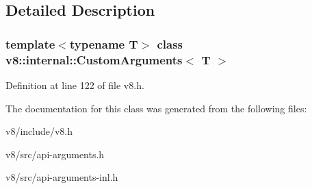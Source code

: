 \subsection{Detailed Description}
\subsubsection*{template$<$typename T$>$\newline
class v8\+::internal\+::\+Custom\+Arguments$<$ T $>$}



Definition at line 122 of file v8.\+h.



The documentation for this class was generated from the following files\+:\begin{DoxyCompactItemize}
\item 
v8/include/v8.\+h\item 
v8/src/api-\/arguments.\+h\item 
v8/src/api-\/arguments-\/inl.\+h\end{DoxyCompactItemize}
